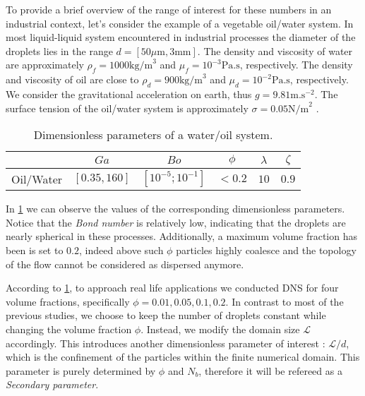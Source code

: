 To provide a brief overview of the range of interest for these numbers in an industrial context, let's consider the example of a vegetable oil/water system.
In most liquid-liquid system encountered in industrial processes the diameter of the droplets lies in the range $d = [50 \mu \text{m}, 3 \text{mm}]$.
The density and viscosity of water are approximately $\rho_f = 1000 \text{kg/m}^3$ and $\mu_f = 10^{-3} \text{Pa.s}$, respectively.
The density and viscosity of oil are close to $\rho_d = 900 \text{kg/m}^3$ and $\mu_d = 10^{-2} \text{Pa.s}$, respectively.
We consider the gravitational acceleration on earth, thus $g= 9.81 \text{m.s}^{-2}$.
The surface tension of the oil/water system is approximately $\sigma = 0.05 \text{N/m}^2$ \citep{de2015gouttes}. 
\begin{table}[h!]
    \centering
    \caption{Dimensionless parameters of a water/oil system.}
    \begin{tabular}{|c||c|c|c|c|c|}
        \hline&$Ga$&$Bo$&$\phi$&$\lambda$&$\zeta$\\ \hline
        \hline Oil/Water&$[0.35,160]$&$[10^{-5};10^{-1}]$&$<0.2$&$10$&$0.9$\\ \hline
    \end{tabular}
    \label{tab:parameters_exp}
\end{table}
In \ref{tab:parameters_exp} we can observe the values of the corresponding dimensionless parameters.  
Notice that the \textit{Bond number} is relatively low, indicating that the droplets are nearly spherical in these processes.
Additionally, a maximum volume fraction has been is set to $0.2$, indeed above such $\phi$ particles highly coalesce and the topology of the flow cannot be considered as dispersed anymore. 


According to \ref{tab:parameters_exp}, to approach real life applications we conducted DNS for four volume fractions, specifically $\phi = 0.01,0.05,0.1,0.2$.
In contrast to most of the previous studies, we choose to keep the number of droplets constant while changing the volume fraction $\phi$. 
Instead, we modify the domain size $\mathcal{L}$ accordingly. 
This introduces another dimensionless parameter of interest : $\mathcal{L}/d$, which is the confinement of the particles within the finite numerical domain. 
This parameter is purely determined by $\phi$ and $N_b$, therefore it will be refereed as a \textit{Secondary parameter}.

